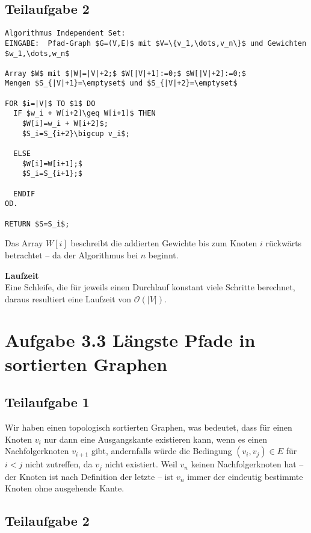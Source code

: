 \documentclass[a4paper, fontsize=10pt]{scrartcl}
\begin{document}
\subsection*{Teilaufgabe 2}

\begin{lstlisting}[mathescape]
Algorithmus Independent Set:
EINGABE:  Pfad-Graph $G=(V,E)$ mit $V=\{v_1,\dots,v_n\}$ und Gewichten $w_1,\dots,w_n$

Array $W$ mit $|W|=|V|+2;$ $W[|V|+1]:=0;$ $W[|V|+2]:=0;$
Mengen $S_{|V|+1}=\emptyset$ und $S_{|V|+2}=\emptyset$
      
FOR $i=|V|$ TO $1$ DO
  IF $w_i + W[i+2]\geq W[i+1]$ THEN
    $W[i]=w_i + W[i+2]$;
    $S_i=S_{i+2}\bigcup v_i$;
    
  ELSE
    $W[i]=W[i+1];$
    $S_i=S_{i+1};$
    
  ENDIF
OD.

RETURN $S=S_i$;

\end{lstlisting}

Das Array $W[i]$ beschreibt die addierten Gewichte bis zum Knoten $i$ rückwärts betrachtet -- da der Algorithmus bei $n$ beginnt. \bigskip

\textbf{Laufzeit}\\
Eine Schleife, die für jeweils einen Durchlauf konstant viele Schritte berechnet, daraus resultiert eine Laufzeit von $\mathcal{O}(|V|)$.\bigskip

\section*{Aufgabe 3.3 Längste Pfade in sortierten Graphen}
\subsection*{Teilaufgabe 1}
Wir haben einen topologisch sortierten Graphen, was bedeutet, dass für einen Knoten $v_i$ nur dann eine Ausgangskante existieren kann, wenn es einen Nachfolgerknoten $v_{i+1}$ gibt, andernfalls würde die Bedingung $(v_i,v_j)\in E$ für $i<j$ nicht zutreffen, da $v_j$ nicht existiert. Weil $v_n$ keinen Nachfolgerknoten hat -- der Knoten ist nach Definition der letzte -- ist $v_n$ immer der eindeutig bestimmte Knoten ohne ausgehende Kante.

\subsection*{Teilaufgabe 2}
\end{document}
